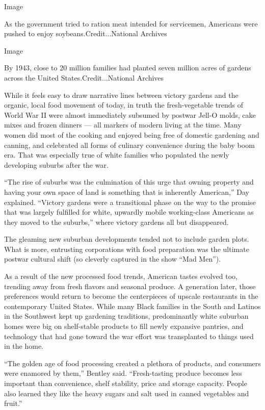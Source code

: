 Image

As the government tried to ration meat intended for servicemen,
Americans were pushed to enjoy soybeans.Credit...National Archives

Image

By 1943, close to 20 million families had planted seven million acres of
gardens across the United States.Credit...National Archives

While it feels easy to draw narrative lines between victory gardens and
the organic, local food movement of today, in truth the fresh-vegetable
trends of World War II were almost immediately subsumed by postwar
Jell-O molds, cake mixes and frozen dinners --- all markers of modern
living at the time. Many women did most of the cooking and enjoyed being
free of domestic gardening and canning, and celebrated all forms of
culinary convenience during the baby boom era. That was especially true
of white families who populated the newly developing suburbs after the
war.

``The rise of suburbs was the culmination of this urge that owning
property and having your own space of land is something that is
inherently American,'' Day explained. ``Victory gardens were a
transitional phase on the way to the promise that was largely fulfilled
for white, upwardly mobile working-class Americans as they moved to the
suburbs,'' where victory gardens all but disappeared.

The gleaming new suburban developments tended not to include garden
plots. What is more, entrusting corporations with food preparation was
the ultimate postwar cultural shift (so cleverly captured in the show
``Mad Men'').

As a result of the new processed food trends, American tastes evolved
too, trending away from fresh flavors and seasonal produce. A generation
later, those preferences would return to become the centerpieces of
upscale restaurants in the contemporary United States. While many Black
families in the South and Latinos in the Southwest kept up gardening
traditions, predominantly white suburban homes were big on shelf-stable
products to fill newly expansive pantries, and technology that had gone
toward the war effort was transplanted to things used in the home.

``The golden age of food processing created a plethora of products, and
consumers were enamored by them,'' Bentley said. ``Fresh-tasting produce
becomes less important than convenience, shelf stability, price and
storage capacity. People also learned they like the heavy sugars and
salt used in canned vegetables and fruit.''

